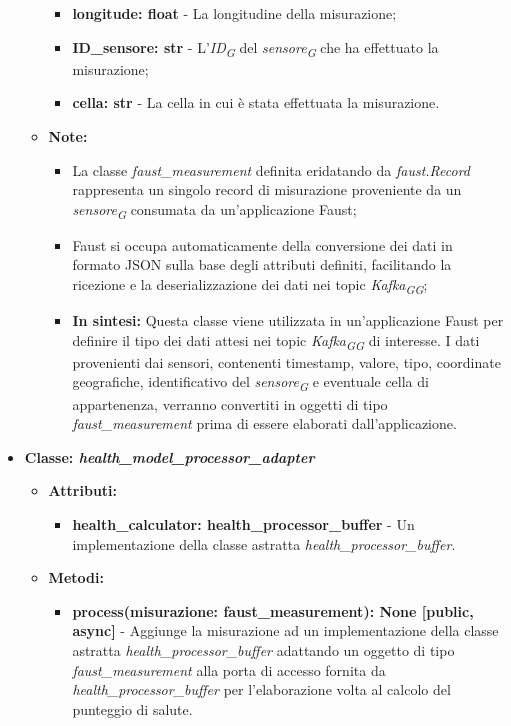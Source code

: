 \begin{itemize}
\begin{itemize}
\begin{itemize}
        \item \textbf{longitude: float} - La longitudine della misurazione;
        \item \textbf{ID\_sensore: str} - L'\textit{ID}\textsubscript{\textit{G}} del \textit{sensore}\textsubscript{\textit{G}} che ha effettuato la misurazione;
        \item \textbf{cella: str} - La cella in cui è stata effettuata la misurazione.
    \end{itemize}
    \item\textbf{Note:}
        \begin{itemize}
            \item La classe \textit{faust\_measurement} definita eridatando da \textit{faust.Record} rappresenta un singolo record di misurazione proveniente da un \textit{sensore}\textsubscript{\textit{G}} consumata da un'applicazione Faust;
            \item Faust si occupa automaticamente della conversione dei dati in formato JSON sulla base degli attributi definiti, facilitando la ricezione e la deserializzazione dei dati nei topic \textit{Kafka}\textsubscript{\textit{G}}\textsubscript{\textit{G}};
            \item \textbf{In sintesi:}
            Questa classe viene utilizzata in un'applicazione Faust per definire il tipo dei dati attesi nei topic \textit{Kafka}\textsubscript{\textit{G}}\textsubscript{\textit{G}} di interesse. I dati provenienti dai sensori, contenenti timestamp, valore, tipo, coordinate geografiche, identificativo del \textit{sensore}\textsubscript{\textit{G}} e eventuale cella di appartenenza, verranno convertiti in oggetti di tipo \textit{faust\_measurement} prima di essere elaborati dall'applicazione.
        \end{itemize}
    \end{itemize}
    \item{\textbf{Classe: \textit{health\_model\_processor\_adapter}}}
    \begin{itemize}
    \item\textbf{Attributi:}
        \begin{itemize}
        \item \textbf{health\_calculator: health\_processor\_buffer} - Un implementazione della classe astratta \textit{health\_processor\_buffer}.
    \end{itemize}
    \item \textbf{Metodi: }
    \begin{itemize}
        \item \textbf{process(misurazione: faust\_measurement): None [public, async]} - Aggiunge la misurazione ad un implementazione della classe astratta \textit{health\_processor\_buffer} adattando un oggetto di tipo \textit{faust\_measurement} alla porta di accesso fornita da \textit{health\_processor\_buffer} per l'elaborazione volta al calcolo del punteggio di salute.

\end{itemize}
\end{itemize}
\end{itemize}
